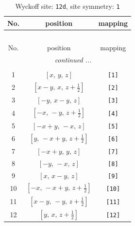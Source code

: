 \documentclass[fleqn,8pt]{jsarticle}
\begin{document}
\begin{longtable}{ccc}
\caption{Wyckoff site: {\tt 12d}, site symmetry: {\tt 1}}
 \\
 \hline \hline
No. & position & mapping \\ \hline \endfirsthead

\multicolumn{2}{l}{\tablename\ \thetable{}} \\
 \hline \hline
No. & position & mapping \\ \hline \endhead

 \hline \hline
\multicolumn{2}{r}{\footnotesize\it continued ...} \\ \endfoot

 \hline \hline
\multicolumn{2}{r}{} \\ \endlastfoot

1 & $\left[ x,\, y,\, z \right]$ & {\tt [1]} \\ \hline
2 & $\left[ x - y,\, x,\, z + \frac{1}{2} \right]$ & {\tt [2]} \\ \hline
3 & $\left[ - y,\, x - y,\, z \right]$ & {\tt [3]} \\ \hline
4 & $\left[ - x,\, - y,\, z + \frac{1}{2} \right]$ & {\tt [4]} \\ \hline
5 & $\left[ - x + y,\, - x,\, z \right]$ & {\tt [5]} \\ \hline
6 & $\left[ y,\, - x + y,\, z + \frac{1}{2} \right]$ & {\tt [6]} \\ \hline
7 & $\left[ - x + y,\, y,\, z \right]$ & {\tt [7]} \\ \hline
8 & $\left[ - y,\, - x,\, z \right]$ & {\tt [8]} \\ \hline
9 & $\left[ x,\, x - y,\, z \right]$ & {\tt [9]} \\ \hline
10 & $\left[ - x,\, - x + y,\, z + \frac{1}{2} \right]$ & {\tt [10]} \\ \hline
11 & $\left[ x - y,\, - y,\, z + \frac{1}{2} \right]$ & {\tt [11]} \\ \hline
12 & $\left[ y,\, x,\, z + \frac{1}{2} \right]$ & {\tt [12]} \\
\end{longtable}
\end{document}
